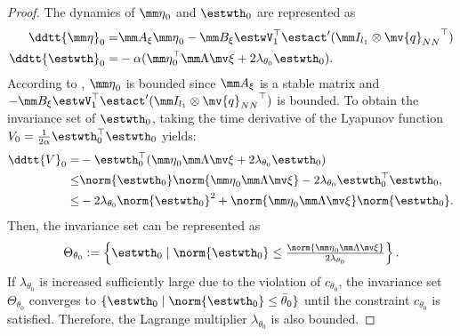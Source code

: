 \documentclass[letterpaper, 10 pt, conference]{ieeeconf}  %
\newcommand*{\q}{\mv{q}}
\begin{document}
\begin{proof}
The dynamics of ${\mm \eta}_0$ and ${\estwth}_0$ are represented as
\begin{equation}
    \begin{aligned}     
        \ddtt{\mm \eta}_0 =& 
        \mm A_\xi{\mm \eta}_0 -\mm B_\xi 
        \estwV_1^\top \estact'(\mm I_{l_1}\otimes {\q_{NN}}^\top )
        \\
        \ddtt{{\estwth}}_0
        =&
        -\alpha 
        (
            {\mm \eta}_0^\top \mm \Lambda\mv \xi+2\lambda_{\theta_0} {\estwth}_0
        )
        .
    \end{aligned}
\end{equation}
According to \cite[Chap.~4 T.~1.9]{Desoer:2009aa}, ${\mm \eta}_0$ is bounded since $\mm A_\xi$ is a stable matrix and $-\mm B_\xi\estwV_1^\top \estact'(\mm I_{l_1}\otimes {\q_{NN}}^\top )$ is bounded.
To obtain the invariance set of ${\estwth}_0$, taking the time derivative of the Lyapunov function $V_0=\tfrac{1}{2\alpha}{\estwth}_0^\top {\estwth}_0$ yields:
\begin{equation}
    \begin{aligned}
        \ddtt {V}_0 =& 
        -{\estwth}_0^\top (
            {\mm \eta}_0\mm \Lambda\mv \xi 
            +2\lambda_{\theta_0}{\estwth}_0
        )
        \\
        \le &
        \norm{{\estwth}_0} \norm{{\mm \eta}_0\mm \Lambda\mv \xi} 
        -
        2\lambda_{\theta_0} {\estwth}_0^\top {\estwth}_0
        ,
        \\
        \le &
        -2\lambda_{\theta_0} 
        \norm{{\estwth}_0}^2 
        + 
        \norm{{\mm \eta}_0\mm \Lambda\mv \xi}
        \norm{{\estwth}_0}
        .
    \end{aligned}
\end{equation}
Then, the invariance set can be represented as 
\begin{equation}
    \Theta_{{\theta}_0} :=
    \left\{
        {\estwth}_0\mid\norm{\estwth_0}
        \le
        \tfrac{
            \norm{{\mm \eta}_0\mm \Lambda\mv \xi}
        }{
            2\lambda_{\theta_0}
        }
    \right\}
    .    
\end{equation}
If $\lambda_{\theta_0}$ is increased sufficiently large due to the violation of $c_{\theta_0}$, the invariance set $\Theta_{{\theta}_0}$ converges to $\{{\estwth}_0 \mid \norm{{\estwth}_0} \le \bar\theta_0\}$ until the constraint $c_{\theta_0}$ is satisfied.
Therefore, the Lagrange multiplier $\lambda_{\theta_0}$ is also bounded.

\end{proof}
\end{document}
